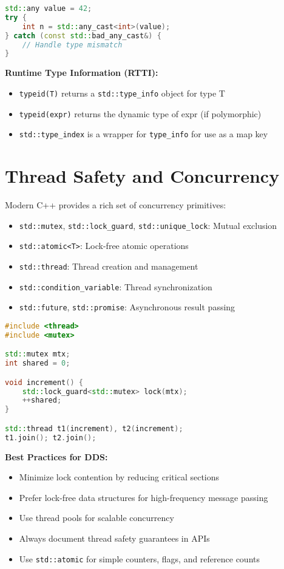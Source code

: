 \documentclass[12pt]{report}
\begin{document}
\begin{lstlisting}[language=C++]
std::any value = 42;
try {
    int n = std::any_cast<int>(value);
} catch (const std::bad_any_cast&) {
    // Handle type mismatch
}
\end{lstlisting}

\textbf{Runtime Type Information (RTTI):}
\begin{itemize}
    \item \texttt{typeid(T)} returns a \texttt{std::type\_info} object for type T
    \item \texttt{typeid(expr)} returns the dynamic type of expr (if polymorphic)
    \item \texttt{std::type\_index} is a wrapper for \texttt{type\_info} for use as a map key
\end{itemize}

\section{Thread Safety and Concurrency}
Modern C++ provides a rich set of concurrency primitives:
\begin{itemize}
    \item \texttt{std::mutex}, \texttt{std::lock\_guard}, \texttt{std::unique\_lock}: Mutual exclusion
    \item \texttt{std::atomic<T>}: Lock-free atomic operations
    \item \texttt{std::thread}: Thread creation and management
    \item \texttt{std::condition\_variable}: Thread synchronization
    \item \texttt{std::future}, \texttt{std::promise}: Asynchronous result passing
\end{itemize}

\begin{lstlisting}[language=C++]
#include <thread>
#include <mutex>

std::mutex mtx;
int shared = 0;

void increment() {
    std::lock_guard<std::mutex> lock(mtx);
    ++shared;
}

std::thread t1(increment), t2(increment);
t1.join(); t2.join();
\end{lstlisting}

\textbf{Best Practices for DDS:}
\begin{itemize}
    \item Minimize lock contention by reducing critical sections
    \item Prefer lock-free data structures for high-frequency message passing
    \item Use thread pools for scalable concurrency
    \item Always document thread safety guarantees in APIs
    \item Use \texttt{std::atomic} for simple counters, flags, and reference counts
\end{itemize}
\end{document}
